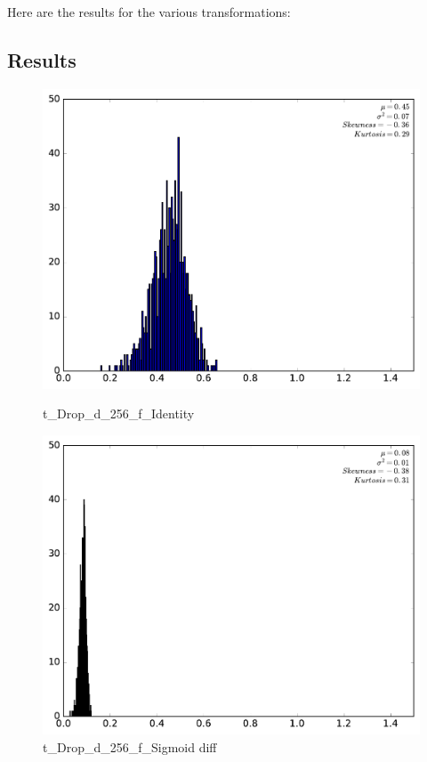 \documentclass[11pt,a4paper]{article}
\begin{document}
	Here are the results for the various transformations:
	
	
	\subsection{Results}
	
	\begin{figure}
		\centering
		\begin{minipage}{.5\textwidth}
			\centering
			\includegraphics[width=.8\linewidth]{img/t_Drop_d_256_f_Identity.pdf}
			\caption{t\_Drop\_d\_256\_f\_Identity}
		\end{minipage}%
		\begin{minipage}{.5\textwidth}
			\centering
			\includegraphics[width=0.8 \linewidth]{img/t_Drop_d_256_f_Sigmoid_diff.pdf}
			\caption{t\_Drop\_d\_256\_f\_Sigmoid diff}
			\label{fig:test2}
		\end{minipage}
	\end{figure}
	
\end{document}
